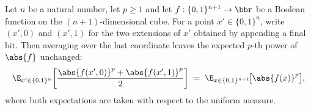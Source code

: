 \begin{lemma}
\leanok
{}
\label{BooleanAnalysis.Hypercontractivity.norm_collapse_clean}
Let $n$ be a natural number, let $p \ge 1$ and let $f : \{0,1\}^{n+1} \to \bbr$ be a
Boolean function on the
$(n+1)$-dimensional cube. For a point $x' \in \{0,1\}^n$, write $(x',0)$ and $(x',1)$
for the two extensions of $x'$ obtained by appending a final bit. Then averaging over
the last coordinate leaves the expected $p$-th power of $\abs{f}$ unchanged:
\[
  \E_{x' \in \{0,1\}^n}\!\left[\frac{\abs{f(x',0)}^p + \abs{f(x',1)}^p}{2}\right]
  \;=\; \E_{x \in \{0,1\}^{n+1}}\!\bigl[\abs{f(x)}^p\bigr],
\]
where both expectations are taken with respect to the uniform measure.
\end{lemma}
